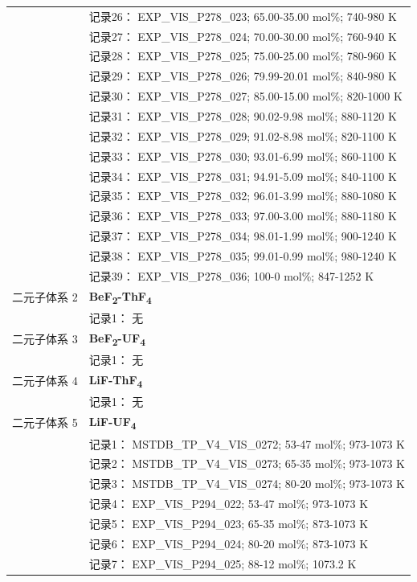 \documentclass[12pt]{article}
\begin{document}
{\begin{longtable}[]{@{}
  >{\raggedright\arraybackslash}p{}
  >{\raggedright\arraybackslash}p{}@{}}
 & 记录26： EXP\_VIS\_P278\_023; 65.00-35.00 mol\%; 740-980 K \\
 & 记录27： EXP\_VIS\_P278\_024; 70.00-30.00 mol\%; 760-940 K \\
 & 记录28： EXP\_VIS\_P278\_025; 75.00-25.00 mol\%; 780-960 K \\
 & 记录29： EXP\_VIS\_P278\_026; 79.99-20.01 mol\%; 840-980 K \\
 & 记录30： EXP\_VIS\_P278\_027; 85.00-15.00 mol\%; 820-1000 K \\
 & 记录31： EXP\_VIS\_P278\_028; 90.02-9.98 mol\%; 880-1120 K \\
 & 记录32： EXP\_VIS\_P278\_029; 91.02-8.98 mol\%; 820-1100 K \\
 & 记录33： EXP\_VIS\_P278\_030; 93.01-6.99 mol\%; 860-1100 K \\
 & 记录34： EXP\_VIS\_P278\_031; 94.91-5.09 mol\%; 840-1100 K \\
 & 记录35： EXP\_VIS\_P278\_032; 96.01-3.99 mol\%; 880-1080 K \\
 & 记录36： EXP\_VIS\_P278\_033; 97.00-3.00 mol\%; 880-1180 K \\
 & 记录37： EXP\_VIS\_P278\_034; 98.01-1.99 mol\%; 900-1240 K \\
 & 记录38： EXP\_VIS\_P278\_035; 99.01-0.99 mol\%; 980-1240 K \\
 & 记录39： EXP\_VIS\_P278\_036; 100-0 mol\%; 847-1252 K  \\

二元子体系 2 & \textbf{BeF\textsubscript{2}-ThF\textsubscript{4}} \\
 & 记录1： 无 \\
二元子体系 3 & \textbf{BeF\textsubscript{2}-UF\textsubscript{4}} \\
 & 记录1： 无 \\
二元子体系 4 & \textbf{LiF-ThF\textsubscript{4}} \\
 & 记录1： 无 \\
二元子体系 5  & \textbf{LiF-UF\textsubscript{4}} \\
 & 记录1： MSTDB\_TP\_V4\_VIS\_0272; 53-47 mol\%; 973-1073 K \\
 & 记录2： MSTDB\_TP\_V4\_VIS\_0273; 65-35 mol\%; 973-1073 K \\
 & 记录3： MSTDB\_TP\_V4\_VIS\_0274; 80-20 mol\%; 973-1073 K \\
 & 记录4： EXP\_VIS\_P294\_022; 53-47 mol\%; 973-1073 K \\
 & 记录5： EXP\_VIS\_P294\_023; 65-35 mol\%; 873-1073 K \\
 & 记录6： EXP\_VIS\_P294\_024; 80-20 mol\%; 873-1073 K \\
 & 记录7： EXP\_VIS\_P294\_025; 88-12 mol\%; 1073.2 K  \\


\end{longtable}}
\end{document}
